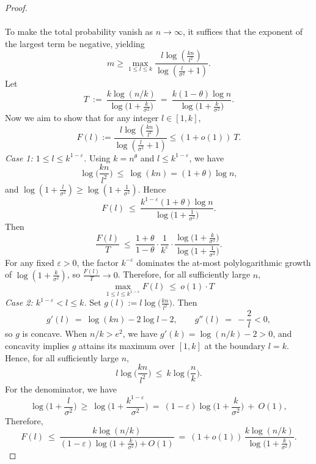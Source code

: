 \documentclass{article}
\begin{document}
\begin{proof}
\\\\
To make the total probability vanish as $n\to\infty$, it suffices that the exponent of the largest term be negative, yielding
\[
m \ge \max_{1\le l\le k}
     \frac{l\log(\frac{kn}{l^2})}{\log(\frac{l}{\sigma^2}+1)}.
\]
Let
\[
T\ :=\ \frac{k\log(n/k)}{\log\!\big(1+\tfrac{k}{\sigma^2}\big)}
\ =\ \frac{k(1-\theta)\log n}{\log\!\big(1+\tfrac{k}{\sigma^2}\big)}.
\]
Now we aim to show that for any integer $l\in[1,k]$,
\[
F(l):=\frac{l\log(\frac{kn}{l^2})}{\log(\frac{l}{\sigma^2}+1)} \le 
(1+o(1))\ T.
\]
\smallskip
\emph{Case 1: $1\le l\le k^{1-\varepsilon}$.}
Using $k=n^\theta$ and $l\le k^{1-\varepsilon}$, we have
\[
\log\!\Big(\frac{kn}{l^2}\Big)\ \le\ \log(kn)= (1+\theta)\log n,
\]
and $\log(1+\tfrac{l}{\sigma^2})\ge \log(1+\tfrac{1}{\sigma^2})$. Hence
\[
F(l)\ \le\ \frac{k^{1-\varepsilon}(1+\theta)\log n}{\log\!\big(1+\tfrac{1}{\sigma^2}\big)}.
\]
Then
\[
\frac{F(l)}{T}
\ \le\
\frac{1+\theta}{1-\theta}\cdot \frac{1}{k^{\varepsilon}}\cdot
\frac{\log\!\big(1+\tfrac{k}{\sigma^2}\big)}{\log\!\big(1+\tfrac{1}{\sigma^2}\big)}.
\]
For any fixed $\varepsilon>0$, the factor $k^{-\varepsilon}$ dominates the at-most polylogarithmic growth of $\log(1+\tfrac{k}{\sigma^2})$, so $\frac{F(l)}{T}\to 0$. Therefore, for all sufficiently large $n$,
\[
\max_{1\le l\le k^{1-\varepsilon}} F(l)\ \le\ o(1)\cdot T
\]
\smallskip
\emph{Case 2: $k^{1-\varepsilon}< l\le k$.}
Set $g(l):=l\log\!\big(\tfrac{kn}{l^2}\big)$. Then
\[
g'(l)\ =\ \log(kn)-2\log l-2,\qquad
g''(l)\ =\ -\frac{2}{l}<0,
\]
so $g$ is concave. When $n/k>e^2$, we have $g'(k)=\log(n/k)-2>0$, and concavity implies $g$ attains its maximum over $[1,k]$ at the boundary $l=k$. Hence, for all sufficiently large $n$,
\[
l\log\!\Big(\frac{kn}{l^2}\Big)\ \le\ k\log\!\Big(\frac{n}{k}\Big).
\]
For the denominator, we have
\[
\log\!\Big(1+\frac{l}{\sigma^2}\Big)\ \ge\ \log\!\Big(1+\frac{k^{1-\varepsilon}}{\sigma^2}\Big)
\ =\ (1-\varepsilon)\log\!\Big(1+\frac{k}{\sigma^2}\Big)\ +\ O(1),
\]
Therefore,
\[
F(l)\ \le\ \frac{k\log(n/k)}{(1-\varepsilon)\log\!\big(1+\tfrac{k}{\sigma^2}\big)+O(1)}
\ =\ (1+o(1))\,\frac{k\log(n/k)}{\log\!\big(1+\tfrac{k}{\sigma^2}\big)}.
\]
\end{proof}
\end{document}
